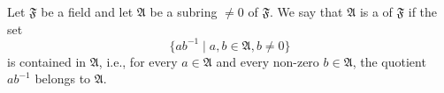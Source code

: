 Let $\mathfrak{F}$ be a field and let $\mathfrak{A}$ be a subring $\neq 0$ of $\mathfrak{F}$. We say that $\mathfrak{A}$ is a  of $\mathfrak{F}$ if the set
$$\{ab^{-1} \mid a, b \in \mathfrak{A}, b \neq 0\}$$
is contained in $\mathfrak{A}$, i.e., for every $a \in \mathfrak{A}$ and every non-zero $b \in \mathfrak{A}$, the quotient $ab^{-1}$ belongs to $\mathfrak{A}$.
